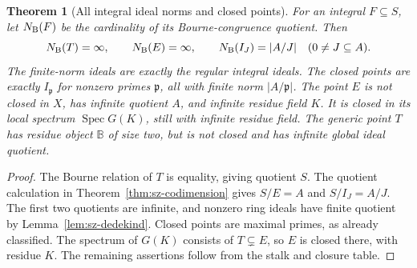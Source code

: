 \documentclass[11pt,a4paper]{article}
\newtheorem{theorem}{Theorem}[section]
\theoremstyle{definition}\newtheorem{definition}[theorem]{Definition}
\begin{document}
\begin{theorem}[All integral ideal norms and closed points]\label{thm:sz-norms}
For an integral \(F\subseteq S\), let \(N_{\rm B}(F)\) be the
cardinality of its Bourne-congruence quotient. Then
\begin{equation}\label{eq:sz-all-norms}
 N_{\rm B}(T)=\infty,\qquad N_{\rm B}(E)=\infty,\qquad
 N_{\rm B}(I_J)=|A/J|\quad(0\ne J\subseteq A).
\end{equation}
The finite-norm ideals are exactly the regular integral ideals.
The closed points are exactly \(I_{\mathfrak p}\) for nonzero
primes \(\mathfrak p\), all with finite norm \(|A/\mathfrak p|\).
The point \(E\) is not closed in \(X\), has infinite quotient \(A\),
and infinite residue field \(K\). It is closed in its local spectrum
\(\operatorname{Spec}G(K)\), still with infinite residue field.
The generic point \(T\) has residue object \(\mathbb B\) of size
two, but is not closed and has infinite global ideal quotient.
\end{theorem}
\begin{proof}
The Bourne relation of \(T\) is equality, giving quotient \(S\).
The quotient calculation in Theorem~\ref{thm:sz-codimension}
gives \(S/E=A\) and \(S/I_J=A/J\). The first two quotients are
infinite, and nonzero ring ideals have finite quotient by
Lemma~\ref{lem:sz-dedekind}. Closed points are maximal primes,
as already classified. The spectrum of \(G(K)\) consists of
\(T\subsetneq E\), so \(E\) is closed there, with residue \(K\).
The remaining assertions follow from the stalk and closure table.
\end{proof}
\end{document}
